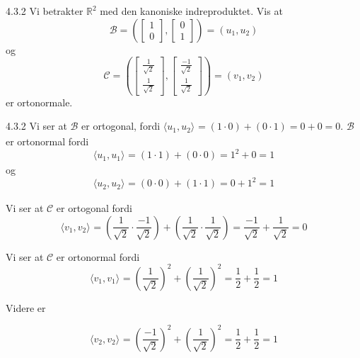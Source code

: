 \documentclass[a4paper,norsk]{article}
\begin{document}
\begin{oppgavebox}{4.3.2}{}
Vi betrakter $ \mathbb{R}^2 $ med den kanoniske indreproduktet. Vis at
\[
    \mathcal{B} = \left( \begin{bmatrix}
        1\\0
    \end{bmatrix}, \begin{bmatrix}
        0\\1
    \end{bmatrix}   \right) = \left( u_1, u_2 \right)  
\]
og \[
    \mathcal{C} = \left( \begin{bmatrix}
        \frac{ 1 }{ \sqrt{ 2 } } \\ \frac{ 1 }{ \sqrt{ 2 } }
    \end{bmatrix}, \begin{bmatrix}
        \frac{ -1 }{ \sqrt{ 2 } } \\ \frac{ 1 }{ \sqrt{ 2 } }
    \end{bmatrix}   \right)  = \left( v_1, v_2 \right) 
\]
er ortonormale. 


\begin{proofbox}{4.3.2}{}
Vi ser at $ \mathcal{B} $ er ortogonal, fordi $ \langle u_1, u_2 \rangle_{  } = \left( 1 \cdot 0 \right) + \left( 0 \cdot 1 \right)  = 0 + 0=0 $. $ \mathcal{B} $ er ortonormal fordi
\[
    \langle u_1, u_1 \rangle_{  } = \left( 1 \cdot 1 \right)  + \left( 0 \cdot 0 \right) = 1^2 +0 =1
\]
og
\[
    \langle u_2, u_2 \rangle_{  } = \left( 0 \cdot 0 \right) + \left( 1 \cdot 1 \right) = 0 + 1^2 = 1
\]



Vi ser at $ \mathcal{C} $ er ortogonal fordi
\[
    \langle v_1, v_2 \rangle_{  } = \left( \frac{ 1 }{ \sqrt{ 2 } } \cdot \frac{ -1 }{ \sqrt{ 2 } } \right) + \left( \frac{ 1 }{ \sqrt{ 2 } } \cdot \frac{ 1 }{ \sqrt{ 2 } } \right) = \frac{ -1 }{ \sqrt{ 2 } } + \frac{ 1 }{ \sqrt{ 2 } } = 0
\]

Vi ser at $ \mathcal{C} $ er ortonormal fordi
\[
    \langle v_1, v_1 \rangle_{  } = \left( \frac{ 1 }{ \sqrt{ 2 } }  \right)^2 + \left( \frac{ 1 }{ \sqrt{ 2 } } \right) ^2 = \frac{ 1 }{ 2 } + \frac{ 1 }{ 2 } = 1
\]

Videre er

\[
    \langle v_2, v_2 \rangle_{  } = \left( \frac{ -1 }{ \sqrt{ 2 } } \right) ^2 + \left( \frac{ 1 }{ \sqrt{ 2 } } \right) ^2 = \frac{ 1 }{ 2 } + \frac{ 1 }{ 2 }= 1
\]

\end{proofbox}
\end{oppgavebox}
\end{document}
